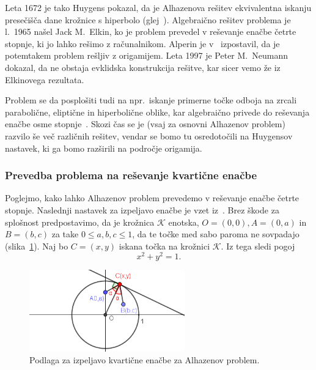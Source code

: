 Leta 1672 je tako Huygens pokazal, da je Alhazenova rešitev ekvivalentna iskanju presečišča dane krožnice s hiperbolo (glej~\cite{nishimura2018}). Algebraično rešitev problema je l.\ 1965 našel Jack M.\ Elkin, ko je problem prevedel v reševanje enačbe četrte stopnje, ki jo lahko rešimo z računalnikom. Alperin je v~\cite{alperin2002} izpostavil, da je potemtakem problem rešljiv z origamijem. Leta 1997 je Peter M.\ Neumann dokazal, da ne obstaja evklidska konstrukcija rešitve, kar sicer vemo že iz Elkinovega rezultata.

Problem se da posplošiti tudi na npr.\ iskanje primerne točke odboja na zrcali parabolične, eliptične in hiperbolične oblike, kar algebraično privede do reševanja enačbe osme stopnje~\cite{alhproblemwiki}. Skozi čas se je (vsaj za osnovni Alhazenov problem) razvilo še več različnih rešitev, vendar se bomo tu osredotočili na Huygensov nastavek, ki ga bomo razširili na področje origamija.

\subsubsection*{Prevedba problema na reševanje kvartične enačbe}

Poglejmo, kako lahko Alhazenov problem prevedemo v reševanje enačbe četrte stopnje. Naslednji nastavek za izpeljavo enačbe je vzet iz~\cite[138--139]{geometricconstructions}. Brez škode za splošnost predpostavimo, da je krožnica $\mathcal{K}$ enotska, $O = (0,0), A = (0,a)$ in $B=(b,c)$ za take $0 \leq a, b, c \leq 1$, da te točke med sabo paroma ne sovpadajo (slika~\ref{fig:alhazen2}). Naj bo $C=(x,y)$ iskana točka na krožnici $\mathcal{K}$. Iz tega sledi pogoj
\begin{equation}
    \label{eq:pogoj_alh1}
    x^2 + y^2 = 1.
\end{equation}

\begin{figure}[h]
    \centering
    \includegraphics[width=0.6\textwidth]{images/alhazen/alhazen2.png}
    \caption[Alhazenov problem -- izpeljava]{Podlaga za izpeljavo kvartične enačbe za Alhazenov problem.}
    \label{fig:alhazen2}
\end{figure}

